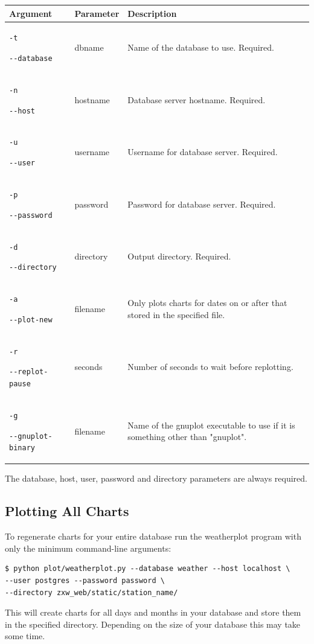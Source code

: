 \documentclass[a4paper,10pt,draft]{book}
\begin{document}
\begin{tabular}{p{3.4cm} l p{8cm}}
\hline
\textbf{Argument} & \textbf{Parameter} & \textbf{Description} \\
\hline
\verb|-t| \par \verb|--database| & dbname & Name of the database to use. Required. \\
\verb|-n| \par \verb|--host| & hostname & Database server hostname. Required. \\
\verb|-u| \par \verb|--user| & username & Username for database server. Required. \\
\verb|-p| \par \verb|--password| & password & Password for database server. Required. \\
\verb|-d| \par \verb|--directory| & directory & Output directory. Required. \\
\verb|-a| \par \verb|--plot-new| & filename & Only plots charts for dates on or after that stored in the specified file. \\
\verb|-r| \par \verb|--replot-pause| & seconds & Number of seconds to wait before replotting.\\
\verb|-g| \par \verb|--gnuplot-binary| & filename & Name of the gnuplot executable to use if it is something other than "gnuplot".\\
\hline
\end{tabular}

The database, host, user, password and directory parameters are always required.

\subsection{Plotting All Charts}

To regenerate charts for your entire database run the weatherplot program with only the minimum command-line arguments:

\begin{verbatim}
$ python plot/weatherplot.py --database weather --host localhost \
--user postgres --password password \
--directory zxw_web/static/station_name/
\end{verbatim}

This will create charts for all days and months in your database and store them in the specified directory. Depending on the size of your database this may take some time.
\end{document}
